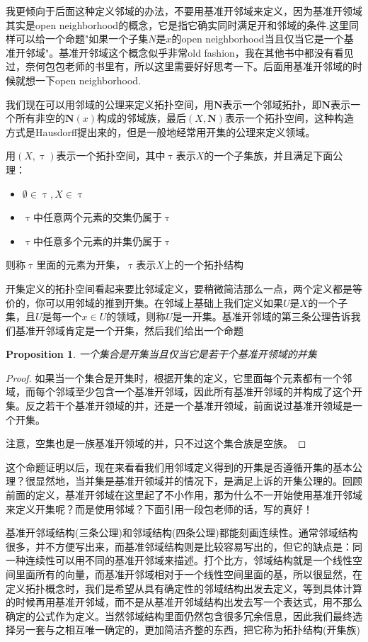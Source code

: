 \documentclass{article}
\newtheorem{proposition}[theorem]{Proposition}
\begin{document}
我更倾向于后面这种定义邻域的办法，不要用基准开邻域来定义，因为基准开领域其实是open neighborhood的概念，它是指它确实同时满足开和邻域的条件.这里同样可以给一个命题"如果一个子集$N$是$x$的open neighborhood当且仅当它是一个基准开邻域"。基准开邻域这个概念似乎非常old fashion，我在其他书中都没有看见过，奈何包包老师的书里有，所以这里需要好好思考一下。后面用基准开邻域的时候就想一下open neighborhood.

我们现在可以用邻域的公理来定义拓扑空间，用$\mathbf{N}$表示一个邻域拓扑，即$\mathbf{N}$表示一个所有非空的$\mathbf{N}(x)$构成的邻域族，最后$(X,\mathbf{N})$表示一个拓扑空间，这种构造方式是Hausdorff提出来的，但是一般地经常用开集的公理来定义领域。

用$(X,\uptau)$表示一个拓扑空间，其中$\uptau$表示$X$的一个子集族，并且满足下面公理：
\begin{itemize}
	\item $\emptyset \in \uptau,X \in \uptau$
	\item $\uptau$中任意两个元素的交集仍属于$\uptau$
	\item $\uptau$中任意多个元素的并集仍属于$\uptau$
\end{itemize}	
则称$\uptau$里面的元素为开集，$\uptau$表示$X$上的一个拓扑结构

开集定义的拓扑空间看起来要比邻域定义，要稍微简洁那么一点，两个定义都是等价的，你可以用邻域的推到开集。在邻域上基础上我们定义如果$U$是$X$的一个子集，且$U$是每一个$x \in U$的领域，则称$U$是一开集。基准开邻域的第三条公理告诉我们基准开邻域肯定是一个开集，然后我们给出一个命题

\begin{proposition}
一个集合是开集当且仅当它是若干个基准开领域的并集
\end{proposition}

\begin{proof}
如果当一个集合是开集时，根据开集的定义，它里面每个元素都有一个邻域，而每个邻域至少包含一个基准开邻域，因此所有基准开邻域的并构成了这个开集。反之若干个基准开领域的并，还是一个基准开领域，前面说过基准开领域是一个开集。

注意，空集也是一族基准开领域的并，只不过这个集合族是空族。
\end{proof}

这个命题证明以后，现在来看看我们用邻域定义得到的开集是否遵循开集的基本公理？很显然地，当并集是基准开领域并的情况下，是满足上诉的开集公理的。回顾前面的定义，基准开邻域在这里起了不小作用，那为什么不一开始使用基准开邻域来定义开集呢？而是使用邻域？下面引用一段包老师的话，写的真好！

基准开邻域结构(三条公理)和邻域结构(四条公理)都能刻画连续性。通常邻域结构很多，并不方便写出来，而基准邻域结构则是比较容易写出的，但它的缺点是：同一种连续性可以用不同的基准开邻域来描述。打个比方，邻域结构就是一个线性空间里面所有的向量，而基准开邻域相对于一个线性空间里面的基，所以很显然，在定义拓扑概念时，我们是希望从具有确定性的邻域结构出发去定义，等到具体计算的时候再用基准开邻域，而不是从基准开邻域结构出发去写一个表达式，用不那么确定的公式作为定义。当然邻域结构里面仍然包含很多冗余信息，因此我们最终选择另一套与之相互唯一确定的，更加简洁齐整的东西，把它称为拓扑结构(开集族)
\end{document}
